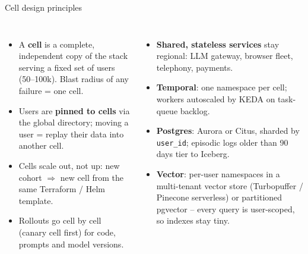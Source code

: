 \documentclass[aspectratio=169,10pt]{beamer}
\begin{document}
\begin{frame}{Cell design principles}
\begin{columns}[T]
\small
\begin{itemize}
  \item A \textbf{cell} is a complete, independent copy of the stack serving a fixed set of users (50--100k). Blast radius of any failure = one cell.
  \item Users are \textbf{pinned to cells} via the global directory; moving a user = replay their data into another cell.
  \item Cells scale out, not up: new cohort $\Rightarrow$ new cell from the same Terraform / Helm template.
  \item Rollouts go cell by cell (canary cell first) for code, prompts and model versions.
\end{itemize}
\small
\begin{itemize}
  \item \textbf{Shared, stateless services} stay regional: LLM gateway, browser fleet, telephony, payments.
  \item \textbf{Temporal}: one namespace per cell; workers autoscaled by KEDA on task-queue backlog.
  \item \textbf{Postgres}: Aurora or Citus, sharded by \texttt{user\_id}; episodic logs older than 90 days tier to Iceberg.
  \item \textbf{Vector}: per-user namespaces in a multi-tenant vector store (Turbopuffer / Pinecone serverless) or partitioned pgvector -- every query is user-scoped, so indexes stay tiny.
\end{itemize}
\end{columns}
\end{frame}
\end{document}
